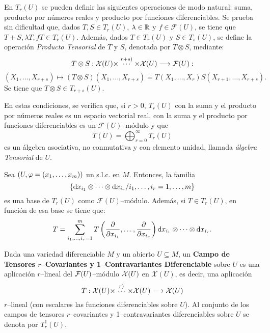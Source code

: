 \documentclass[cursovd_portada.tex]{subfiles}
\begin{document}
En $T_r(U)$ se pueden definir las siguientes operaciones de modo natural: suma, producto por números reales y
producto por funciones diferenciables. Se prueba sin dificultad que, dados $T,S\in T_r(U)$, $\lambda\in\mathbb{R}$ y
$f\in\mathcal{F}(U)$, se tiene que $T+S,\lambda T,fT\in T_r(U)$. Además, dados $T\in T_r(U)$ y $S\in T_s(U)$, se
define la operación {\it Producto Tensorial} de $T$ y $S$, denotada por $T\otimes S$, mediante:
$$T\otimes S:{\cal X}(U)\times\stackrel{r+s)}\cdots\times\mathcal{X}(U)\longrightarrow\mathcal{F}(U):$$
$$(X_1,\dots ,X_{r+s})\mapsto(T\otimes S)(X_1,\dots ,X_{r+s})=T(X_1,\dots ,X_r)S(X_{r+1},\dots ,X_{r+s}).$$
\hs Se tiene que $T\otimes S\in T_{r+s}(U)$.
\par
En estas condiciones, se verifica que, si $r>0$, $T_r(U)$ con la suma y el producto por números reales es un
espacio vectorial real, con la suma y el producto por funciones diferenciables es un $\mathcal{F}(U)$--módulo y
que
$$T(U)=\bigoplus_{r=0}^{\infty}T_r(U)$$
es un álgebra asociativa, no conmutativa y con elemento unidad, llamada {\it álgebra Tensorial} de $U$.
\begin{prop}
Sea $(U,\varphi=(x_1,\dots ,x_m))$ un s.l.c. en $M$. Entonces, la familia
$$\{{\rm d} x_{i_1}\otimes\cdots\otimes{\rm d} x_{i_r}/i_1,\dots ,i_r=1,\dots ,m\}$$
es una base de $T_r(U)$ como $\mathcal{F}(U)$--módulo. Además, si $T\in T_r(U)$, en función de esa base se tiene
que:
$$T=\sum_{i_1,\dots ,i_r=1}^mT\left(\displaystyle{\frac{\partial}{\partial x_{i_1}}},\dots
,\displaystyle{\frac{\partial}{\partial x_{i_r}}}\right){\rm d} x_{i_1}\otimes\cdots\otimes{\rm d} x_{i_r}.$$
\end{prop}
\begin{defi}
Dada una variedad diferenciable $M$ y un abierto $U\subseteq M$, un {\bf Campo de Tensores $r$--Covariantes y
1--Contravariantes Diferenciable} sobre $U$ es una aplicación $r$--lineal del ${\cal F}(U)$--módulo ${\cal X}(U)$ en
$\mathcal{X}(U)$, es decir, una aplicación
$$T:{\cal X}(U)\times\stackrel{r)}\cdots\times\mathcal{X}(U)\longrightarrow\mathcal{X}(U)$$
$r$--lineal (con escalares las funciones diferenciables sobre $U$). Al conjunto de los campos de tensores
$r$--covariantes y 1--contravariantes diferenciables sobre $U$ se denota por $T_r^1(U)$.
\end{defi}
\end{document}
